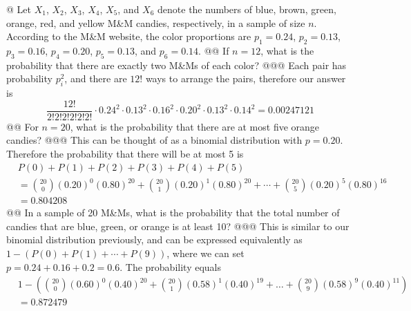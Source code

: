 \documentclass[10pt]{article}
\begin{document}
\begin{easylist}[enumerate]
    @ Let $X_1$, $X_2$, $X_3$, $X_4$, $X_5$, and $X_6$ denote the numbers of blue, brown, green, orange, red, and yellow
    M\&M candies, respectively, in a sample of size $n$. According to the M\&M website, the color proportions are $p_1 =
    0.24$, $p_2 = 0.13$, $p_3 = 0.16$, $p_4 = 0.20$, $p_5 = 0.13$, and $p_6 = 0.14$.
    @@ If $n = 12$, what is the probability that there are exactly two M\&Ms of each color?
    @@@ Each pair has probability $p_i^2$, and there are $12!$ ways to arrange the pairs, therefore our answer is
    \[ \frac{12!}{2!2!2!2!2!2!} \cdot 0.24^2 \cdot 0.13^2 \cdot 0.16^2 \cdot 0.20^2 \cdot 0.13^2 \cdot 0.14^2 = \boxed{0.00247121} \]
    @@ For $n = 20$, what is the probability that there are at most five orange candies?
    @@@ This can be thought of as a binomial distribution with $p=0.20$. Therefore the probability that there will be at
    most 5 is
    \[
        \begin{aligned}
            & P(0) + P(1) + P(2) + P(3) + P(4) + P(5)\\
            & = \binom{20}{0} {(0.20)}^0 {(0.80)}^{20} + \binom{20}{1} {(0.20)}^1 {(0.80)}^{20} + \cdots + \binom{20}{5} {(0.20)}^5 {(0.80)}^{16}\\
            & = \boxed{0.804208}
        \end{aligned}
    \]
    @@ In a sample of 20 M\&Ms, what is the probability that the total number of candies that are blue, green, or orange
    is at least 10?
    @@@ This is similar to our binomial distribution previously, and can be expressed equivalently as $1 - (P(0) + P(1)
    + \cdots + P(9))$, where we can set $p=0.24+0.16+0.2=0.6$. The probability equals
    \[
        \begin{aligned}
            & 1 - \left( \binom{20}{0} {(0.60)}^0 {(0.40)}^{20} + \binom{20}{1} {(0.58)}^1 {(0.40)}^{19} + \ldots + \binom{20}{9} {(0.58)}^9
            {(0.40)}^{11} \right)\\
            & = \boxed{0.872479}
        \end{aligned}
    \]



\end{easylist}
\end{document}
